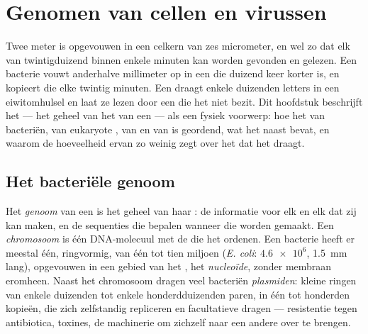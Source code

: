 \chapter{Genomen van cellen en virussen}\label{ch:b1:genomes}

Twee meter  is opgevouwen in een celkern van zes micrometer, en wel zo dat elk
van twintigduizend  binnen enkele minuten kan worden gevonden en gelezen. Een
bacterie vouwt anderhalve millimeter op in een  die duizend keer korter is, en
kopieert die elke twintig minuten. Een  draagt enkele duizenden letters in een
eiwitomhulsel en laat ze lezen door een  die het niet bezit. Dit hoofdstuk
beschrijft het \emph{} --- het geheel van het  van een  --- als
een fysiek voorwerp: hoe het  van bacteriën, van eukaryote , van
 en van  is geordend, wat het naast  bevat, en waarom de
hoeveelheid ervan zo weinig zegt over het  dat het draagt.

\section{Het bacteriële genoom}

\begin{definition}\label{def:b1:genomes:genome}
Het \emph{genoom} van een  is het geheel van haar : de
informatie voor elk  en elk  dat zij kan maken, en de sequenties die
bepalen wanneer die worden gemaakt. Een \emph{chromosoom} is één
DNA-molecuul met de  die het ordenen. Een bacterie heeft er meestal één,
ringvormig, van één tot tien miljoen  (\emph{E. coli}: $\num{4.6e6}$,
\qty{1.5}{mm} lang), opgevouwen in een gebied van het , het
\emph{nucleoïde}, zonder membraan eromheen. Naast het chromosoom
dragen veel bacteriën \emph{plasmiden}: kleine ringen van enkele
duizenden tot enkele honderdduizenden paren, in één tot honderden kopieën, die
zich zelfstandig repliceren en facultatieve  dragen --- resistentie tegen
antibiotica, toxines, de machinerie om zichzelf naar een andere  over te
brengen.
\end{definition}

